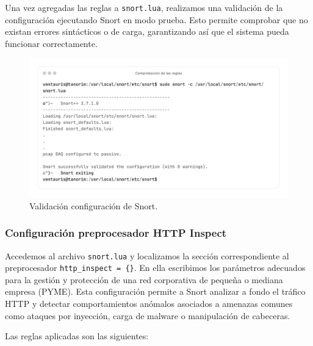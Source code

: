 \documentclass[11pt,a4paper,twoside]{report}
\begin{document}
Una vez agregadas las reglas a \texttt{snort.lua}, realizamos una validación de la configuración ejecutando Snort en modo prueba. Esto permite comprobar que no existan errores sintácticos o de carga, garantizando así que el sistema pueda funcionar correctamente.

\begin{figure}[H]
	\centering
	\includegraphics[scale=0.12]{instalacion_reglas_snort/3-3.png}
	\caption{Validación configuración de Snort.}
\end{figure}

\newpage

\subsubsection*{Configuración preprocesador HTTP Inspect}

Accedemos al archivo \texttt{snort.lua} y localizamos la sección correspondiente al preprocesador \texttt{http\_inspect = \{\}}. En ella escribimos los parámetros adecuados para la gestión y protección de una red corporativa de pequeña o mediana empresa (PYME). Esta configuración permite a Snort analizar a fondo el tráfico HTTP y detectar comportamientos anómalos asociados a amenazas comunes como ataques por inyección, carga de malware o manipulación de cabeceras.

Las reglas aplicadas son las siguientes:
\newline
\end{document}
